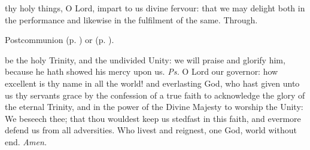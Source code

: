 
\postcommunion
{} thy holy things, O Lord, impart to us divine fervour: that we may delight both in the performance and likewise in the fulfilment of the same. Through.
\begin{rubric}
     Postcommunion  (p. \pageref{SPAgainst}) or  (p. \pageref{SPChiefBishop}).
\end{rubric}



\fancyhead[RE,LO]{}


\introit
{} be the holy Trinity, and the undivided Unity: we will praise and glorify him, because he hath showed his mercy upon us. \textit{Ps.} O Lord our governor: how excellent is thy name in all the world!
\collect
{} and everlasting God, who hast given unto us thy servants grace by the confession of a true faith to acknowledge the glory of the eternal Trinity, and in the power of the Divine Majesty to worship the Unity: We beseech thee; that thou wouldest keep us stedfast in this faith, and evermore defend us from all adversities. Who livest and reignest, one God, world without end. \textit{Amen.}
%



